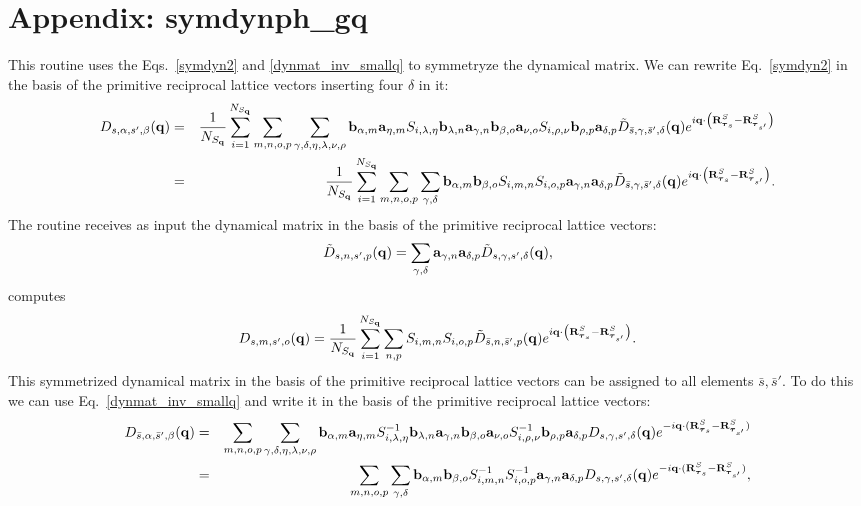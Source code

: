 \documentclass[12pt,a4paper,twoside]{report}
\begin{document}
\section{Appendix: symdynph\_gq}
This routine uses the Eqs.~\ref{symdyn2} and
\ref{dynmat_inv_smallq} to symmetryze the dynamical matrix. We can rewrite Eq.~\ref{symdyn2} in the basis of the primitive reciprocal lattice vectors inserting four
$\delta$ in it:
\begin{eqnarray}
D_{s,\alpha,s',\beta}({\bf q}) &=& {1\over N_{S_{\bf q}}}
\sum_{i=1}^{N_{S_{\bf q}}}
\sum_{m,n,o,p}
\sum_{\gamma,\delta,\eta,\lambda,\nu,\rho}
{\bf b}_{\alpha,m} {\bf a}_{\eta,m}
S_{i,\lambda,\eta} {\bf b}_{\lambda,n} {\bf a}_{\gamma,n}  {\bf b}_{\beta,o} {\bf a}_{\nu,o} S_{i,\rho,\nu} {\bf b}_{\rho,p} {\bf a}_{\delta,p}
\tilde D_{\bar s,\gamma,\bar s',\delta}({\bf q})
e^{i {\bf q} \cdot \left( {\bf R}^{S}_{\boldsymbol{\tau}_s} - {\bf R}^{S}_{\boldsymbol{\tau}_{s'}} \right) }
\nonumber\\
&=& {1\over N_{S_{\bf q}}}
\sum_{i=1}^{N_{S_{\bf q}}}
\sum_{m,n,o,p}
\sum_{\gamma, \delta}
{\bf b}_{\alpha,m} {\bf b}_{\beta,o}
S_{i,m,n} S_{i,o,p} {\bf a}_{\gamma,n} {\bf a}_{\delta,p}
\tilde D_{\bar s,\gamma,\bar s',\delta}({\bf q})
e^{i {\bf q} \cdot \left( {\bf R}^{S}_{\boldsymbol{\tau}_s} - {\bf R}^{S}_{\boldsymbol{\tau}_{s'}} \right)}.
\label{symdyn2_crys}
\end{eqnarray}
The routine receives as input the dynamical matrix in the basis of the primitive reciprocal lattice vectors: 
\begin{equation}
\tilde D_{s,n,s',p}({\bf q})
=\sum_{\gamma, \delta} {\bf a}_{\gamma,n} {\bf a}_{\delta,p}
\tilde D_{s,\gamma,s',\delta}({\bf q}),
\end{equation}
computes 
\begin{equation}
D_{s,m,s',o}({\bf q})
={1\over N_{S_{\bf q}}}
\sum_{i=1}^{N_{S_{\bf q}}}
\sum_{n,p}
S_{i,m,n} S_{i,o,p}
\tilde D_{\bar s,n,\bar s',p}({\bf q})
e^{i {\bf q} \cdot \left( {\bf R}^{S}_{\boldsymbol{\tau}_s} - {\bf R}^{S}_{\boldsymbol{\tau}_{s'}} \right)}. 
\end{equation}
This symmetrized dynamical matrix in the basis
of the primitive reciprocal lattice vectors 
can be assigned to all elements $\bar s, \bar s'$.
To do this we can use Eq.~\ref{dynmat_inv_smallq}
and write it in the basis of the primitive reciprocal lattice vectors:
\begin{eqnarray}
D_{\bar s,\alpha,\bar s',\beta}({\bf q}) &=&
\sum_{m,n,o,p} \sum_{\gamma,\delta,\eta,\lambda,\nu,\rho} {\bf b}_{\alpha,m} {\bf a}_{\eta,m} S^{-1}_{i,\lambda,\eta} {\bf b}_{\lambda,n} {\bf a}_{\gamma,n} {\bf b}_{\beta,o} {\bf a}_{\nu,o}  S^{-1}_{i,\rho,\nu} {\bf b}_{\rho,p} {\bf a}_{\delta,p}
D_{s,\gamma,s',\delta}({\bf q})
e^{-i {\bf q} \cdot ({\bf R}^{S}_{\boldsymbol{\tau}_s} - {\bf R}^{S}_{\boldsymbol{\tau}_{s'}})} \nonumber \\
&=& \sum_{m,n,o,p} \sum_{\gamma,\delta} {\bf b}_{\alpha,m} {\bf b}_{\beta,o}  S^{-1}_{i,m,n}    S^{-1}_{i,o,p} {\bf a}_{\gamma,n} {\bf a}_{\delta,p}
D_{s,\gamma,s',\delta}({\bf q})
e^{-i {\bf q} \cdot ({\bf R}^{S}_{\boldsymbol{\tau}_s} - {\bf R}^{S}_{\boldsymbol{\tau}_{s'}})}, 
\label{dynmat_inv_smallq_rec}
\end{eqnarray}
\end{document}
